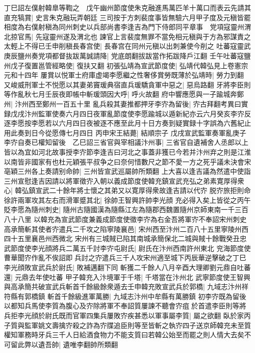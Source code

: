 丁巳詔左僕射韓臯等鞫之　戊午幽州節度使朱克融進馬萬匹羊十萬口而表云先請其直充犒賞|{
	史言朱克融玩弄朝廷}
三司按于方刺裴度事皆無驗六月甲子度及元稹皆罷相度為右僕射稹為同州刺史以兵部尚書李逢吉為門下侍郎同平章事　党項寇靈州渭北掠官馬|{
	先寇靈州遂及渭北也}
諫官上言裴度無罪不當免相元稹與于方為邪謀責之太輕上不得已壬申削稹長春宫使|{
	長春宫在同州元稹以出刺兼使今削之}
吐蕃寇靈武　庚辰鹽州奏党項都督抜跋萬誠請降|{
	党底朗翻拔跋當作拓跋降戶江翻}
壬午吐蕃寇鹽州戊子復置邕管經略使|{
	復扶又翻}
初張弘靖為宣武節度使|{
	弘靖代韓弘見上卷憲宗元和十四年}
屢賞以悦軍士府庫虚竭李愿繼之性奢侈賞勞既薄於弘靖時|{
	勞力到翻}
又峻威刑軍士不悦愿以其妻弟竇瑗典宿直兵瑗驕貪軍中惡之|{
	惡烏路翻}
牙將李臣則等作亂秋七月壬辰夜即帳中斬瑗頭因大呼|{
	呼火故翻}
府中響應愿與一子踰城奔鄭州|{
	汴州西至鄭州一百五十里}
亂兵殺其妻推都押牙李㝏為留後|{
	㝏古拜翻考異曰實録戊戌汴州監軍使奏六月四日夜軍亂節度使李愿踰城以遁新紀亦云六月癸亥李㝏反逐李愿按李愿若以六月四日夜被逐不應至此月十日方奏到疑實録十字誤為六舊紀止用此奏到日今從愿傳七月四日}
丙申宋王結薨|{
	結順宗子}
戊戌宣武監軍奏軍亂庚子李㝏自奏已權知留後　乙巳詔三省官與宰相議汴州事|{
	三省官自遺補舍人丞郎以上}
皆以為宜如河北故事授李㝏節李逢吉曰河北之事蓋非獲已今若并汴州弃之則是江淮以南皆非國家有也杜元穎張平叔争之曰奈何惜數尺之節不愛一方之死乎議未決會宋亳穎三州各上奏請别命帥|{
	三州皆宣武巡屬帥所類翻}
上大喜以逢吉議為然遣中使詣三州宣慰逢吉因請以將軍徵㝏入朝以義成節度使韓充鎮宣武充弘之弟素寛厚得衆心|{
	韓弘鎮宣武二十餘年將士懷之其弟又以寛厚得衆故逢吉請以代㝏}
脱㝏旅拒則命徐許兩軍攻其左右而滑軍蹙其北|{
	徐帥王智興許帥李光顔}
充必得入矣上皆從之丙午貶李愿為隨州刺史|{
	隨州古隨國漢為隨縣江左為隨郡西魏置隨州京師東南一千三百八十八里}
以韓充為宣武節度兼義成節度使徵李㝏為右金吾將軍㝏不奉詔宋州刺史高承簡斬其使者㝏遣兵二千攻之陷寧陵襄邑|{
	宋州西至汴州二百八十五里寧陵州西四十五里襄邑州西微北}
宋州有三城賊已陷其南城承簡保北二城與賊十餘戰癸丑忠武節度使李光顔將兵二萬五千討李㝏屯尉氏|{
	尉氏在汴州西南許州東北}
兖海節度使曹華聞㝏作亂不俟詔即兵討之㝏遣兵三千人攻宋州適至城下丙辰華逆擊破之丁巳李光顔敗宣武兵於尉氏|{
	敗補邁翻下同}
斬獲二千餘人八月辛酉大理卿劉元鼎自吐蕃還|{
	元鼎去年使吐蕃}
甲子韓充入汴境軍于千塔|{
	千塔當在汴州北}
武寧節度使王智興與高承簡共破宣武兵斬首千餘級餘衆遁去壬申韓充敗宣武兵於郭橋|{
	九域志汴州祥符縣有郭橋鎮}
斬首千餘級進軍萬勝|{
	九域志汴州中牟縣有萬勝鎮}
初李㝏既為留後以都知兵馬使李質為腹心及㝏除將軍不奉詔質屢諫不聽會㝏疽於首遣李臣則等將兵拒李光顔於尉氏既而官軍四集兵屢敗㝏疾甚悉以軍事屬李質|{
	屬之欲翻}
臥於家丙子質與監軍姚文壽擒㝏殺之詐為㝏牒追臣則等至皆斬之執㝏四子送京師韓充未至質權知軍務時牙兵三千人日給酒食物力不能支質曰若韓公始至而罷之則人情大去矣不可留此弊以遺吾帥|{
	遺唯李翻帥所類翻}
